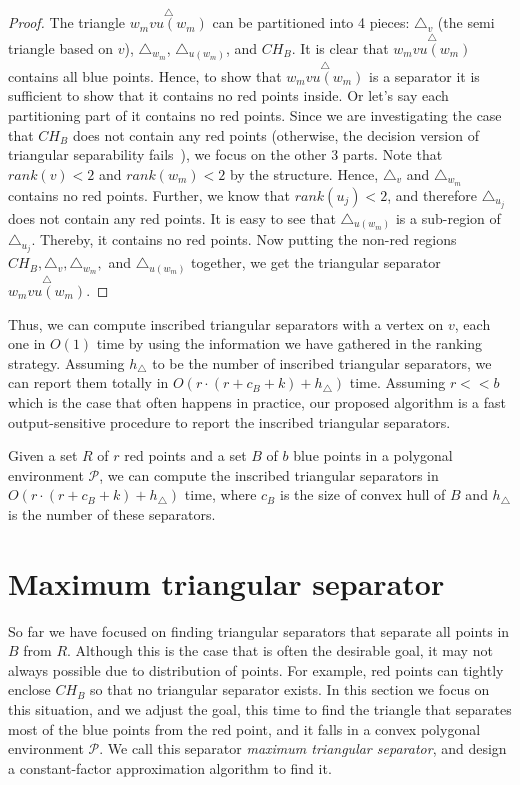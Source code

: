 \documentclass[a4paper,UKenglish]{lipics-v2018}
\theoremstyle{definition}
\begin{document}
\begin{proof}
The triangle $\overset{\triangle}{w_m v {u(w_m)}}$ can be partitioned into 4 pieces: $\triangle_v$ (the semi triangle based on $v$), $\triangle_{w_m}$, $\triangle_{u(w_m)}$, and $CH_B$. It is clear that $\overset{\triangle}{w_m v u(w_m)}$ contains all blue points. Hence, to show that $\overset{\triangle}{w_m v u(w_m)}$ is a separator it is sufficient to show that it contains no red points inside. Or let's say each partitioning part of it contains no red points. Since we are investigating the case that $CH_B$ does not contain any red points (otherwise, the decision version of triangular separability fails~\cite{conv-sep}), we focus on the other 3 parts. Note that $rank(v)<2$ and $rank(w_m)<2$ by the structure. Hence, $\triangle_v$ and $\triangle_{w_m}$ contains no red points. Further, we know that $rank(u_j)<2$, and therefore $\triangle_{u_j}$ does not contain any red points. It is easy to see that $\triangle_{u(w_m)}$ is a sub-region of $\triangle_{u_j}$. Thereby, it contains no red points. Now putting the non-red regions $CH_B, \triangle_v, \triangle_{w_m},$ and $\triangle_{u(w_m)}$ together, we get the triangular separator $\overset{\triangle}{w_m v u(w_m)}$.
\end{proof}

Thus, we can compute inscribed triangular separators with a vertex on $v$, each one in $O(1)$ time by using the information we have gathered in the ranking strategy. Assuming $h_\triangle$ to be the number of inscribed triangular separators, we can report them totally in $O(r \cdot (r+c_B+k)+h_\triangle)$ time. Assuming $r << b$ which is the case that often happens in practice, our proposed algorithm is a fast output-sensitive procedure to report the inscribed triangular separators.

\begin{theorem}
Given a set $R$ of $r$ red points and a set $B$ of $b$ blue points in a polygonal environment $\mathcal P$, we can compute the inscribed triangular separators in $O(r \cdot (r+c_B+k)+h_\triangle)$ time, where $c_B$ is the size of convex hull of $B$ and $h_\triangle$ is the number of these separators.
\end{theorem}



\section{Maximum triangular separator}
So far we have focused on finding triangular separators that separate all points in $B$ from $R$. Although this is the case that is often the desirable goal, it may not always possible due to distribution of points. For example, red points can tightly enclose $CH_B$ so that no triangular separator exists. In this section we focus on this situation, and we  adjust the goal, this time to find the triangle that separates most of the blue points from the red point, and it falls in a convex polygonal environment $\mathcal P$. We call this separator \emph{maximum triangular separator}, and design a constant-factor approximation algorithm to find it.
\end{document}
